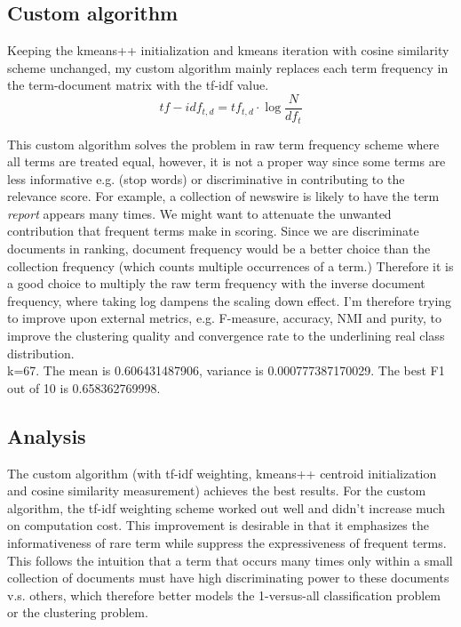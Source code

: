 \documentclass{article}
\begin{document}
\subsection{Custom algorithm}
Keeping the kmeans++ initialization and kmeans iteration with cosine similarity scheme unchanged, my custom algorithm mainly replaces each term frequency in the term-document matrix with the tf-idf value.  
\[ tf-idf_{t,d} = tf_{t,d} \cdot \log \frac{N}{df_t}\]

This custom algorithm solves the problem in raw term frequency scheme where all terms are treated equal, however, it is not a proper way since some terms are less informative e.g. (stop words) or discriminative in contributing to the relevance score. For example, a collection of newswire is likely to have the term \textit{report} appears many times. We might want to attenuate the unwanted contribution that frequent terms make in scoring. Since we are discriminate documents in ranking, document frequency would be a better choice than the collection frequency (which counts multiple occurrences of a term.) Therefore it is a good choice to multiply the raw term frequency with the inverse document frequency, where taking log dampens the scaling down effect. I'm therefore trying to improve upon external metrics, e.g. F-measure, accuracy, NMI and purity, to improve the clustering quality and convergence rate to the underlining real class distribution. \\

k=67. The mean is 0.606431487906, variance is 0.000777387170029. The best F1 out of 10 is 0.658362769998.\\

\subsection{Analysis}
The custom algorithm (with tf-idf weighting, kmeans++ centroid initialization and cosine similarity measurement) achieves the best results. For the custom algorithm, the tf-idf weighting scheme worked out well and didn't increase much on computation cost. This improvement is desirable in that it emphasizes the informativeness of rare term while suppress the expressiveness of frequent terms. This follows the intuition that a term that occurs many times only within a small collection of documents must have high discriminating power to these documents v.s. others, which therefore better models the 1-versus-all classification problem or the clustering problem.\\
\end{document}
